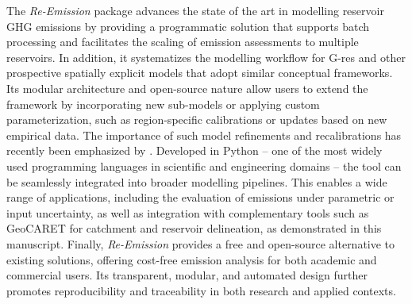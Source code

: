 \documentclass[review, authoryear, 1p]{elsarticle} %
\begin{document}
The \emph{Re-Emission} package advances the state of the art in modelling reservoir \ac{GHG} emissions by providing a programmatic solution that supports batch processing and facilitates the scaling of emission assessments to multiple reservoirs.
In addition, it systematizes the modelling workflow for G-res and other prospective spatially explicit models that adopt similar conceptual frameworks. 
Its modular architecture and open-source nature allow users to extend the framework by incorporating new sub-models or applying custom parameterization, such as region-specific calibrations or updates based on new empirical data.
The importance of such model refinements and recalibrations has recently been emphasized by \citet{Pilla2025}.
Developed in Python -- one of the most widely used programming languages in scientific and engineering domains -- the tool can be seamlessly integrated into broader modelling pipelines.
This enables a wide range of applications, including the evaluation of emissions under parametric or input uncertainty, as well as integration with complementary tools such as GeoCARET for catchment and reservoir delineation, as demonstrated in this manuscript.
Finally, \emph{Re-Emission} provides a free and open-source alternative to existing solutions, offering cost-free emission analysis for both academic and commercial users.
Its transparent, modular, and automated design further promotes reproducibility and traceability in both research and applied contexts.

\end{document}
